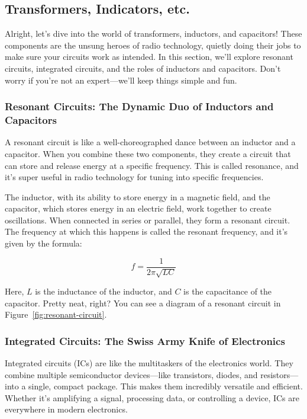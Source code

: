 \subsection{Transformers, Indicators, etc.}
\label{subsec:transformers-ind}

Alright, let’s dive into the world of transformers, inductors, and capacitors! These components are the unsung heroes of radio technology, quietly doing their jobs to make sure your circuits work as intended. In this section, we’ll explore resonant circuits, integrated circuits, and the roles of inductors and capacitors. Don’t worry if you’re not an expert—we’ll keep things simple and fun.

\subsubsection*{Resonant Circuits: The Dynamic Duo of Inductors and Capacitors}
A resonant circuit is like a well-choreographed dance between an inductor and a capacitor. When you combine these two components, they create a circuit that can store and release energy at a specific frequency. This is called resonance, and it’s super useful in radio technology for tuning into specific frequencies.

The inductor, with its ability to store energy in a magnetic field, and the capacitor, which stores energy in an electric field, work together to create oscillations. When connected in series or parallel, they form a resonant circuit. The frequency at which this happens is called the resonant frequency, and it’s given by the formula:

\begin{equation}
f = \frac{1}{2\pi\sqrt{LC}}
\label{eq:resonant-frequency}
\end{equation}

Here, \( L \) is the inductance of the inductor, and \( C \) is the capacitance of the capacitor. Pretty neat, right? You can see a diagram of a resonant circuit in Figure~\ref{fig:resonant-circuit}.

\subsubsection*{Integrated Circuits: The Swiss Army Knife of Electronics}
Integrated circuits (ICs) are like the multitaskers of the electronics world. They combine multiple semiconductor devices—like transistors, diodes, and resistors—into a single, compact package. This makes them incredibly versatile and efficient. Whether it’s amplifying a signal, processing data, or controlling a device, ICs are everywhere in modern electronics.

